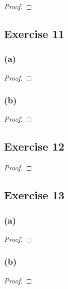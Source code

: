 \documentclass[14pt]{extarticle}
\begin{document}
\begin{proof}

\end{proof}

\subsection{Exercise 11}

\subsubsection{(a)}

\begin{proof}

\end{proof}

\subsubsection{(b)}

\begin{proof}

\end{proof}

\subsection{Exercise 12}

\begin{proof}

\end{proof}

\subsection{Exercise 13}

\subsubsection{(a)}

\begin{proof}

\end{proof}

\subsubsection{(b)}

\begin{proof}

\end{proof}
\end{document}
